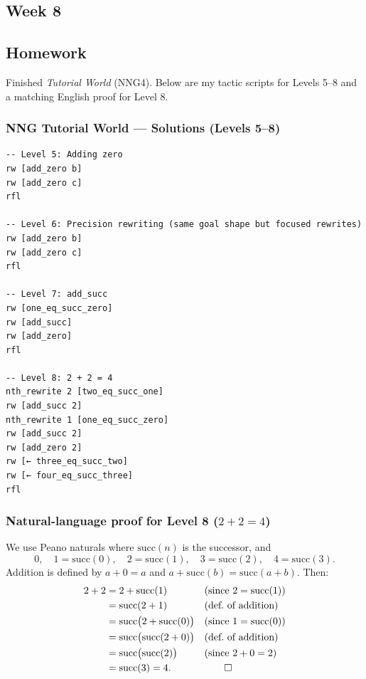 \documentclass{article}
\theoremstyle{theorem}
\theoremstyle{definition}
\theoremstyle{remark}
\begin{document}
\subsection{Week 8}\label{sec:week8}
\smallskip
\subsection*{Homework}
Finished \emph{Tutorial World} (NNG4). Below are my tactic scripts for Levels 5–8 and a matching English proof for Level 8.

\subsubsection*{NNG Tutorial World — Solutions (Levels 5–8)}
\begin{lstlisting}
-- Level 5: Adding zero
rw [add_zero b]
rw [add_zero c]
rfl

-- Level 6: Precision rewriting (same goal shape but focused rewrites)
rw [add_zero b]
rw [add_zero c]
rfl

-- Level 7: add_succ
rw [one_eq_succ_zero]
rw [add_succ]
rw [add_zero]
rfl

-- Level 8: 2 + 2 = 4
nth_rewrite 2 [two_eq_succ_one]
rw [add_succ 2]
nth_rewrite 1 [one_eq_succ_zero]
rw [add_succ 2]
rw [add_zero 2]
rw [← three_eq_succ_two]
rw [← four_eq_succ_three]
rfl
\end{lstlisting}

\subsubsection*{Natural-language proof for Level 8 (\(2+2=4\))}
We use Peano naturals where \(\mathrm{succ}(n)\) is the successor, and
\[
0,\quad 1=\mathrm{succ}(0),\quad 2=\mathrm{succ}(1),\quad
3=\mathrm{succ}(2),\quad 4=\mathrm{succ}(3).
\]
Addition is defined by \(a+0=a\) and \(a+\mathrm{succ}(b)=\mathrm{succ}(a+b)\).
Then:
\[
\begin{aligned}
2+2
&= 2+\mathrm{succ}(1) &&\text{(since \(2=\mathrm{succ}(1)\))}\\
&= \mathrm{succ}(2+1) &&\text{(def.\ of addition)}\\
&= \mathrm{succ}\big(2+\mathrm{succ}(0)\big) &&\text{(since \(1=\mathrm{succ}(0)\))}\\
&= \mathrm{succ}\big(\mathrm{succ}(2+0)\big) &&\text{(def.\ of addition)}\\
&= \mathrm{succ}\big(\mathrm{succ}(2)\big) &&\text{(since \(2+0=2\))}\\
&= \mathrm{succ}(3) = 4. &&\qedhere
\end{aligned}
\]
\end{document}
